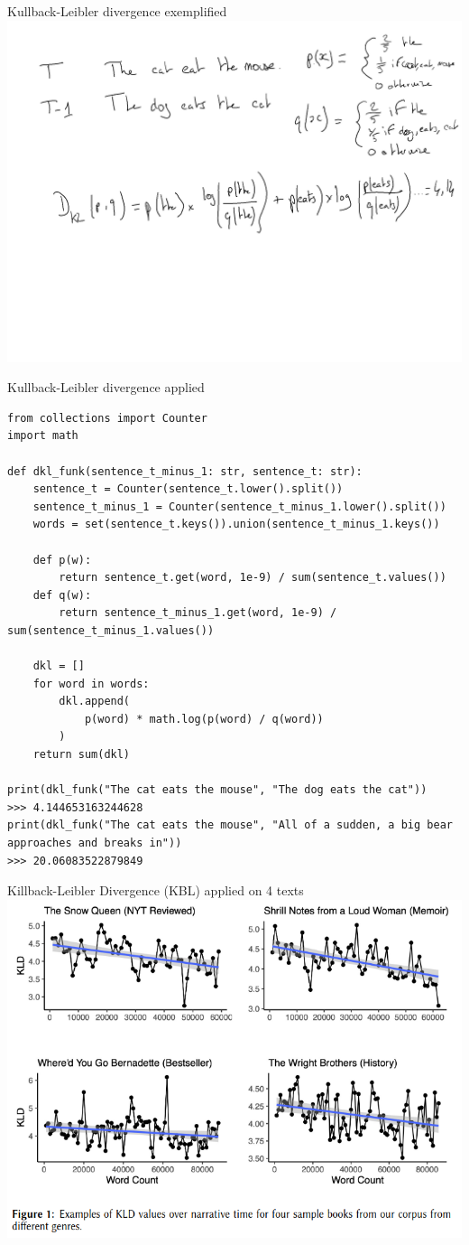 \documentclass[aspectratio=169]{beamer}
\begin{document}
\begin{frame}{Kullback-Leibler divergence exemplified}
    \centering
    \includegraphics[width=.8\linewidth]{nlp-for-ch/images/dkl.png}
\end{frame}

\begin{frame}[fragile]{Kullback-Leibler divergence applied}

\begin{verbatim}
from collections import Counter
import math

def dkl_funk(sentence_t_minus_1: str, sentence_t: str):
    sentence_t = Counter(sentence_t.lower().split())
    sentence_t_minus_1 = Counter(sentence_t_minus_1.lower().split())
    words = set(sentence_t.keys()).union(sentence_t_minus_1.keys())
    
    def p(w):
        return sentence_t.get(word, 1e-9) / sum(sentence_t.values())
    def q(w):
        return sentence_t_minus_1.get(word, 1e-9) / sum(sentence_t_minus_1.values())
        
    dkl = []    
    for word in words:
        dkl.append(
            p(word) * math.log(p(word) / q(word))
        )
    return sum(dkl)

print(dkl_funk("The cat eats the mouse", "The dog eats the cat"))
>>> 4.144653163244628
print(dkl_funk("The cat eats the mouse", "All of a sudden, a big bear approaches and breaks in"))
>>> 20.06083522879849
\end{verbatim}
\end{frame}

\begin{frame}{Killback-Leibler Divergence (KBL) applied on 4 texts}
    \centering
    \includegraphics[width=.60\linewidth]{intro-to-ch/images/entrop_examples.png}
\end{frame}
\end{document}
